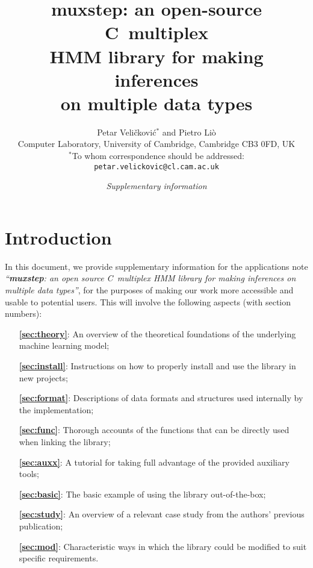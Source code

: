 \documentclass[12pt,openany]{article}
\def\CC{{C\nolinebreak[4]\hspace{-.05em}\raisebox{.4ex}{\tiny\bf ++}}}
\def\CCC{{C\nolinebreak[4]\hspace{-.05em}\raisebox{.4ex}{\small\bf ++}}}
\begin{document}
	\title{\bf muxstep: an open-source \CCC\ multiplex\\ HMM library for making inferences \\on multiple data types}
	\author{Petar Veli\v{c}kovi\'{c}$^*$ and Pietro Li\`{o}\\{\small Computer Laboratory, University of Cambridge, Cambridge CB3 0FD, UK}\\{\footnotesize $^*$To whom correspondence should be addressed: {\tt petar.velickovic@cl.cam.ac.uk}}}
	\date{\it Supplementary information}
	\maketitle
\tableofcontents
	\section{Introduction}
	In this document, we provide supplementary information for the applications note \emph{``{\bf muxstep}: an open source \CC\ multiplex HMM library for making inferences on multiple data types''}, for the purposes of making our work more accessible and usable to potential users. This will involve the following aspects (with section numbers):
	\begin{itemize}
		\item[{\bf \cref{sec:theory}}:] An overview of the theoretical foundations of the underlying machine learning model;
		\item[{\bf \cref{sec:install}}:] Instructions on how to properly install and use the library in new projects;
		\item[{\bf \cref{sec:format}}:] Descriptions of data formats and structures used internally by the implementation;
		\item[{\bf \cref{sec:func}}:] Thorough accounts of the functions that can be directly used when linking the library;
		\item[{\bf \cref{sec:auxx}}:] A tutorial for taking full advantage of the provided auxiliary tools;
		\item[{\bf \cref{sec:basic}}:] The basic example of using the library out-of-the-box;
		\item[{\bf \cref{sec:study}}:] An overview of a relevant case study from the authors' previous publication;
		\item[{\bf \cref{sec:mod}}:] Characteristic ways in which the library could be modified to suit specific requirements.
	\end{itemize}
	
\end{document}
